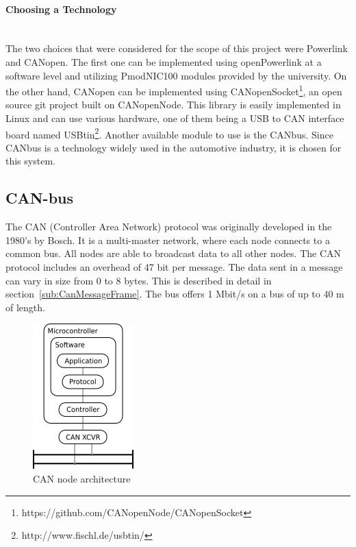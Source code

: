 \paragraph{Choosing a Technology}~\\
The two choices that were considered for the scope of this project were Powerlink and CANopen.
The first one can be implemented using openPowerlink at a software level and utilizing PmodNIC100 modules provided by the university.
On the other hand, CANopen can be implemented using CANopenSocket\footnote{https://github.com/CANopenNode/CANopenSocket}, an open source git project built on CANopenNode.
This library is easily implemented in Linux and can use various hardware, one of them being a USB to CAN interface board named USBtin\footnote{http://www.fischl.de/usbtin/}.
Another available module to use is the CANbus.
Since CANbus is a technology widely used in the automotive industry, it is chosen for this system.



\subsection{CAN-bus}
The CAN (Controller Area Network) protocol was originally developed in the 1980's by Bosch.
It is a multi-master network, where each node connects to a common bus.
All nodes are able to broadcast data to all other nodes.
The CAN protocol includes an overhead of 47 bit per message.
The data sent in a message can vary in size from 0 to 8 bytes.
This is described in detail in section~\ref{sub:CanMessageFrame}.
The bus offers 1 Mbit/s on a bus of up to 40 \si{\metre} of length.

\begin{figure}[h!]
	\centering
	\includegraphics{graphics/canbus_setup}
	\caption{CAN node architecture}
	\label{fig:canbus_setup}
\end{figure}

